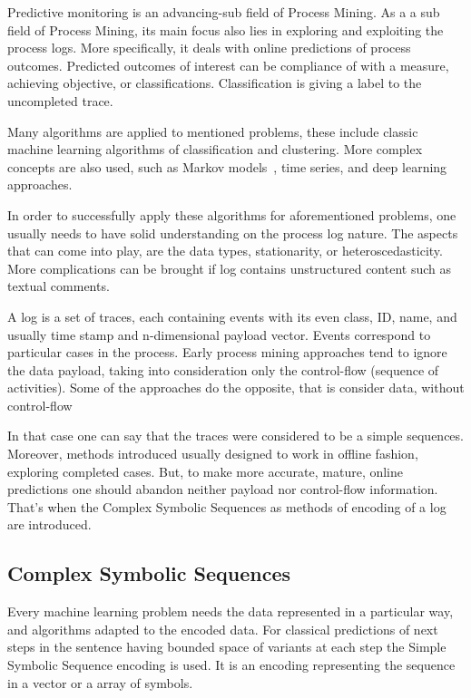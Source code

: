 Predictive monitoring is an advancing-sub field of Process Mining. As a a sub field of Process Mining, its main focus also lies in exploring and exploiting the process logs. More specifically, it deals with online predictions of process outcomes. Predicted outcomes of interest can be compliance of with a measure, achieving objective, or classifications. Classification is giving a label to the uncompleted trace.  
\par
Many algorithms are applied to mentioned problems, these include classic machine learning algorithms of classification and clustering. More complex concepts are also used, such as Markov models~\cite{Leontjeva2015}, time series, and deep learning\cite{niek96732,evermann,quteprints96732} approaches. 
\par
In order to successfully apply these algorithms for aforementioned problems, one usually needs to have solid understanding on the process log nature. The aspects that can come into play, are the data types, stationarity, or heteroscedasticity. More complications can be brought if log contains unstructured content such as textual comments.
\par
A log is a set of traces, each containing events with its even class, ID, name, and usually time stamp and n-dimensional payload vector. Events correspond to particular cases in the process. Early process mining approaches tend to ignore the data payload, taking into consideration only the control-flow (sequence of activities). Some of the approaches do the opposite, that is consider data, without control-flow~\cite{vanderAalst2010,DBLP:journals/is/AalstSS11,Schonenberg2008}  
\par
In that case one can say that the traces were considered to be a simple sequences. Moreover, methods introduced usually designed to work in offline fashion, exploring completed cases. But, to make more accurate, mature, online predictions one should abandon neither payload nor control-flow information. That's when the Complex Symbolic Sequences as methods of encoding of a log are introduced. 



\subsection{Complex Symbolic Sequences}

Every machine learning problem needs the data represented in a particular way, and algorithms adapted to the encoded data. For classical predictions of next steps in the sentence having bounded space of variants at each step the Simple Symbolic Sequence encoding is used. It is an encoding representing the sequence in a vector or a array of symbols.  

